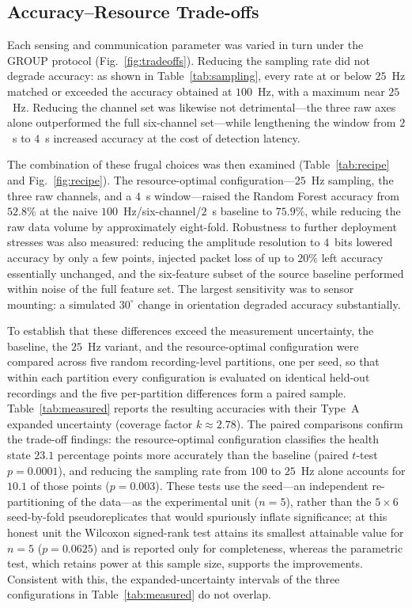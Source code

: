 \subsection{Accuracy--Resource Trade-offs}
\label{subsec:tradeoff}
Each sensing and communication parameter was varied in turn under the GROUP
protocol (Fig.~\ref{fig:tradeoffs}). Reducing the sampling rate did not degrade
accuracy: as shown in Table~\ref{tab:sampling}, every rate at or below $25$~Hz
matched or exceeded the accuracy obtained at $100$~Hz, with a maximum near
$25$~Hz. Reducing the channel set was likewise not detrimental---the three raw
axes alone outperformed the full six-channel set---while lengthening the window
from $2$~s to $4$~s increased accuracy at the cost of detection latency.

The combination of these frugal choices was then examined
(Table~\ref{tab:recipe} and Fig.~\ref{fig:recipe}). The resource-optimal
configuration---$25$~Hz sampling, the three raw channels, and a $4$~s
window---raised the Random Forest accuracy from $52.8\%$ at the naive
$100$~Hz/six-channel/$2$~s baseline to $75.9\%$, while reducing the raw data
volume by approximately eight-fold. Robustness to further deployment stresses was
also measured: reducing the amplitude resolution to $4$~bits lowered accuracy by
only a few points, injected packet loss of up to $20\%$ left accuracy essentially
unchanged, and the six-feature subset of the source baseline performed within
noise of the full feature set. The largest sensitivity was to sensor mounting: a
simulated $30^{\circ}$ change in orientation degraded accuracy substantially.

To establish that these differences exceed the measurement uncertainty, the
baseline, the $25$~Hz variant, and the resource-optimal configuration were
compared across five random recording-level partitions, one per seed, so that
within each partition every configuration is evaluated on identical held-out
recordings and the five per-partition differences form a paired sample.
Table~\ref{tab:measured} reports the resulting accuracies with their Type~A
expanded uncertainty (coverage factor $k\approx2.78$). The paired comparisons
confirm the trade-off findings: the resource-optimal configuration classifies the
health state $23.1$ percentage points more accurately than the baseline (paired
$t$-test $p=0.0001$), and reducing the sampling rate from $100$ to $25$~Hz alone
accounts for $10.1$ of those points ($p=0.003$). These tests use the seed---an
independent re-partitioning of the data---as the experimental unit ($n=5$), rather
than the $5\times6$ seed-by-fold pseudoreplicates that would spuriously inflate
significance; at this honest unit the Wilcoxon signed-rank test attains its
smallest attainable value for $n=5$ ($p=0.0625$) and is reported only for
completeness, whereas the parametric test, which retains power at this sample
size, supports the improvements. Consistent with this, the expanded-uncertainty
intervals of the three configurations in Table~\ref{tab:measured} do not overlap.

